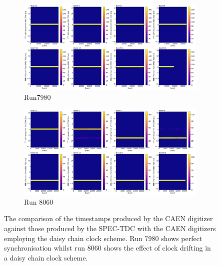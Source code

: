 \begin{figure}[htbp!]
\begin{subfigure}[h]{1.00\linewidth}
\centering    
\includegraphics[width=\linewidth]{TTT_SPEC_diff_run7980}
\caption{Run7980}
\end{subfigure}
\hfill
\begin{subfigure}[h]{1.00\linewidth}
\centering    
\includegraphics[width=\linewidth]{TTT_SPEC_diff_run8060}
\caption{Run 8060}
\end{subfigure}%
\caption[daisychainSPEC]{
The comparison of the timestamps produced by the CAEN digitizer against those produced by the SPEC-TDC with the CAEN digitizers employing the daisy chain clock scheme.
Run 7980 shows perfect synchronisation whilst run 8060 shows the effect of clock drifting in a daisy chain clock scheme.
}
\label{fig:daisychainSPEC}
\end{figure}


